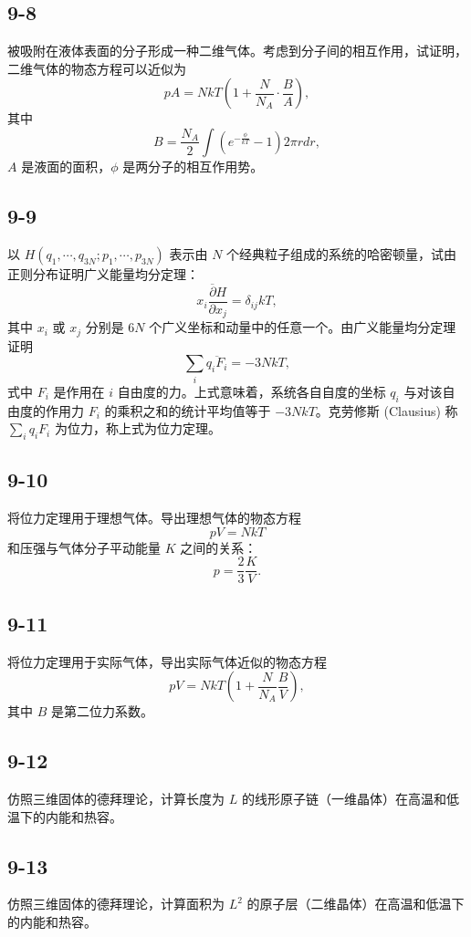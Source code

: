 \newpage
\subsection{9-8}
被吸附在液体表面的分子形成一种二维气体。考虑到分子间的相互作用，试证明，二维气体的物态方程可以近似为
$$ pA = NkT \left( 1 + \frac{N}{N_A} \cdot \frac{B}{A} \right), $$
其中
$$ B = \frac{N_A}{2} \int \left( e^{-\frac{\phi}{kT}} - 1 \right) 2 \pi rdr, $$
$A$ 是液面的面积，$\phi$ 是两分子的相互作用势。

\newpage
\subsection{9-9}
以 $H(q_1, \cdots, q_{3N}; p_1, \cdots, p_{3N})$ 表示由 $N$ 个经典粒子组成的系统的哈密顿量，试由正则分布证明广义能量均分定理：
$$ \overline{x_i \frac{\partial H}{\partial x_j}} = \delta_{ij} kT, $$
其中 $x_i$ 或 $x_j$ 分别是 $6N$ 个广义坐标和动量中的任意一个。由广义能量均分定理证明
$$ \sum_i \overline{q_i F_i} = -3NkT, $$
式中 $F_i$ 是作用在 $i$ 自由度的力。上式意味着，系统各自自度的坐标 $q_i$ 与对该自由度的作用力 $F_i$ 的乘积之和的统计平均值等于 $-3NkT$。克劳修斯 (Clausius) 称 $\sum_i q_i F_i$ 为位力，称上式为位力定理。

\newpage
\subsection{9-10}
将位力定理用于理想气体。导出理想气体的物态方程
$$ pV = NkT $$
和压强与气体分子平动能量 $K$ 之间的关系：
$$ p = \frac{2}{3} \frac{K}{V}. $$

\newpage
\subsection{9-11}
将位力定理用于实际气体，导出实际气体近似的物态方程
$$ pV = NkT \left( 1 + \frac{N}{N_A} \frac{B}{V} \right), $$
其中 $B$ 是第二位力系数。

\newpage
\subsection{9-12}
仿照三维固体的德拜理论，计算长度为 $L$ 的线形原子链（一维晶体）在高温和低温下的内能和热容。

\newpage
\subsection{9-13}
仿照三维固体的德拜理论，计算面积为 $L^2$ 的原子层（二维晶体）在高温和低温下的内能和热容。

